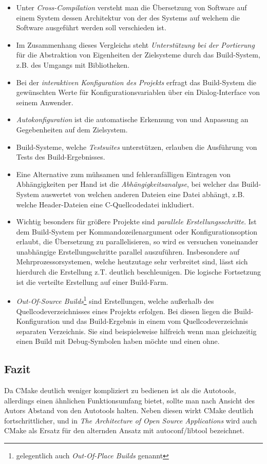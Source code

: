 \begin{itemize}
%
\item Unter \emph{Cross-Compilation} versteht man die Übersetzung von Software
auf einem System dessen Architektur von der des Systems auf welchem die Software
ausgeführt werden soll verschieden ist.
%
\item Im Zusammenhang dieses Vergleichs steht \emph{Unterstützung bei der
Portierung} für die Abstraktion von Eigenheiten der Zielsysteme durch das
Build-System, z.B. des Umgangs mit Bibliotheken.
%
\item Bei der \emph{interaktiven Konfiguration des Projekts} erfragt das
Build-System die gewünschten Werte für Konfigurationsvariablen über ein
Dialog-Interface von seinem Anwender.
%
\item \emph{Autokonfiguration} ist die automatische Erkennung von und Anpassung
an Gegebenheiten auf dem Zielsystem.
%
\item Build-Systeme, welche \emph{Testsuites} unterstützen, erlauben die
Ausführung von Tests des Build-Ergebnisses.
%
%
\item Eine Alternative zum mühsamen und fehleranfälligen Eintragen von
Abhängigkeiten per Hand ist die \emph{Abhängigkeitsanalyse}, bei welcher das
Build-System auswertet von welchen anderen Dateien eine Datei abhängt, z.B.
welche Header-Dateien eine C-Quellcodedatei inkludiert.
%
\item Wichtig besonders für größere Projekte sind \emph{parallele
Erstellungsschritte}. Ist dem Build-System per Kommandozeilenargument oder
Konfigurationsoption erlaubt, die Übersetzung zu parallelisieren, so wird es
versuchen voneinander unabhängige Erstellungsschritte parallel auszuführen.
Insbesondere auf Mehrprozessorsystemen, welche heutzutage sehr verbreitet sind,
lässt sich hierdurch die Erstellung z.T. deutlich beschleunigen. Die logische
Fortsetzung ist die verteilte Erstellung auf einer Build-Farm.
%
\item \emph{Out-Of-Source Builds}\footnote{gelegentlich auch \emph{Out-Of-Place
Builds} genannt} sind Erstellungen, welche außerhalb des Quellcodeverzeichnisses
eines Projekts erfolgen. Bei diesen liegen die Build-Konfiguration und das
Build-Ergebnis in einem vom Quellcodeverzeichnis separaten Verzeichnis. Sie sind
beispielsweise hilfreich wenn man gleichzeitig einen Build mit Debug-Symbolen
haben möchte und einen ohne.
%
\end{itemize}

\subsection*{Fazit}
%
Da CMake deutlich weniger kompliziert zu bedienen ist als die Autotools,
allerdings einen ähnlichen Funktionsumfang bietet, sollte man nach Ansicht des
Autors Abstand von den Autotools halten. Neben diesen wirkt CMake deutlich
fortschrittlicher, und in \textit{The Architecture of Open Source Applications}
 wird auch CMake als Ersatz für den alternden Ansatz mit
autoconf/libtool bezeichnet.

